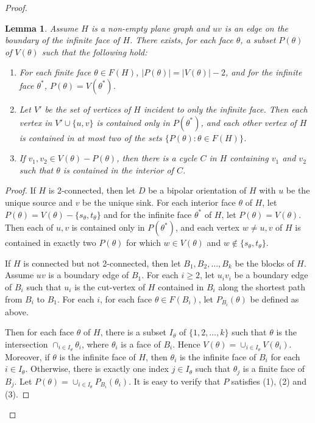 \documentclass[11pt,a4paper]{article}
\newtheorem{lem}{Lemma}
\theoremstyle{definition}
\begin{document}
\begin{proof}
\begin{lem}
    \label{lem:assignment}
    Assume $H$ is a non-empty plane graph and $uv$ is an edge on the boundary of the infinite face of $H$. There exists,    for each   face $\theta $, a subset $P(\theta)$ of $V(\theta)$ such that the following hold:
    \begin{enumerate}
    \item For each finite face $\theta \in F(H)$, 
$|P(\theta)| =|V(\theta)|-2 $, and for the infinite face $\theta^*$, $P(\theta) =V(\theta^*)$.
\item Let
$V'$ be the set of vertices of $H$ incident to only the infinite face.
Then each vertex in $V'\cup \{u,v\}$ is contained only in $P(\theta^*)$, and each other
vertex  of $H$ is contained in at most two of the sets $\{P(\theta): \theta \in F(H)\}$.
\item If  $v_1,v_2 \in V(\theta)-P(\theta)$, then there is a cycle $C$ in $H$ containing $v_1$ and $v_2$ such that $\theta$ is contained in the interior of $C$.
\end{enumerate}
\end{lem} 
\begin{proof}
 If $H$ is $2$-connected, then let $D$ be a bipolar orientation of $H$ with $u$ be the unique source and $v$ be the unique sink. 
For each interior face $\theta$ of $H$, let $P(\theta) =V(\theta)-\{s_{\theta}, t_{\theta}\}$ and for the infinite face $\theta^*$ of $H$, let $P(\theta) =V(\theta)$. Then each
of $u,v$ is contained only in $P(\theta^*)$, and each 
vertex $w \ne u,v $ of $H$ is contained in exactly two $P(\theta)$ for which $w \in V(\theta)$ and $ w \notin \{s_\theta, t_\theta\}$. 
 

If $H$ is connected but not 2-connected, then let $B_1, B_2, \ldots, B_k$ be the blocks of $H$. Assume $uv$ is a boundary edge of $B_1$. For each $i \ge 2$, let $u_iv_i$ be a boundary edge of $B_i$ such that $u_i$ is the cut-vertex of $H$ contained in $B_i$ along the shortest path from $B_i$ to $B_1$. For each $i$, for each face $\theta \in F(B_i)$, let $P_{B_i}(\theta)$ be defined as above. 

Then for each face $\theta$ of $H$, 
there is a subset $I_\theta$ of $\{1,2,\ldots, k\}$ such that $\theta$ is the intersection $\cap_{i \in I_\theta} \theta_i$, where $\theta_i$ is a face of $B_i$. Hence $V(\theta) = \cup_{i \in I_\theta}V(\theta_i)$. Moreover, if $\theta$ is the infinite face of $H$, then  $\theta_i$ is the infinite  face of $B_i$ for each $i \in I_\theta$. Otherwise, there is exactly one index $j \in I_\theta$ such that $\theta_j$ is a finite face of $B_j$.   Let $P(\theta)=\cup_{i \in I_\theta}P_{B_i}(\theta_i)$. It is easy to verify that $P$ satisfies (1), (2) and (3).


\end{proof}
\end{proof}
\end{document}
